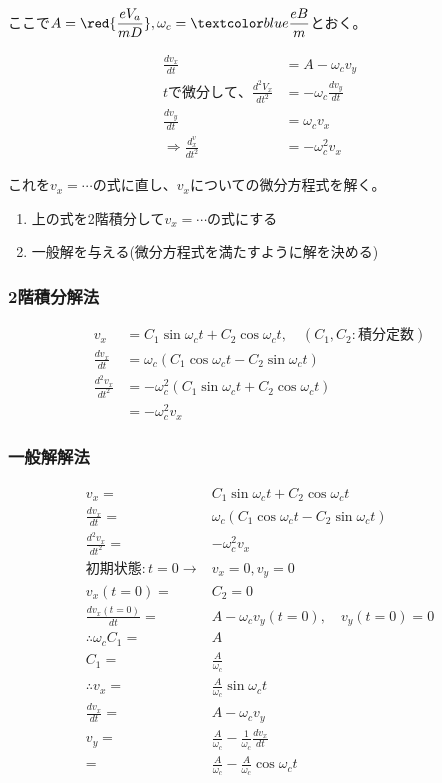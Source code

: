 \documentclass[12pt]{ltjsarticle}
\newcommand{\ds}{\displaystyle}
\begin{document}
ここで$\ds A=\red{\frac{eV_a}{mD}},\omega_c=\blue{\frac{eB}{m}}$とおく。

\begin{align*}
\frac{dv_x}{dt}&=A-\omega_cv_y\\
tで微分して、\frac{d^2V_x}{dt^2}&=-\omega_c\frac{dv_y}{dt}\\
\frac{dv_y}{dt}&=\omega_cv_x\\
\Rightarrow \frac{d^v_x}{dt^2}&=-\omega_c^2v_x
\end{align*}

これを$v_x=\cdots$の式に直し、$v_x$についての微分方程式を解く。
\begin{enumerate}
\item 上の式を2階積分して$v_x=\cdots$の式にする
\item 一般解を与える(微分方程式を満たすように解を決める)
\end{enumerate}

\subsubsection*{2階積分解法}
\begin{align*}
v_x&=C_1\sin{\omega_ct}+C_2\cos{\omega_ct},\quad (C_1,C_2:積分定数)\\
\frac{dv_x}{dt}&=\omega_c(C_1\cos{\omega_ct}-C_2\sin{\omega_ct})\\
\frac{d^2v_x}{dt^2}&=
-\omega_c^2(C_1\sin{\omega_ct}+C_2\cos{\omega_ct})\\
&=-\omega_c^2v_x
\end{align*}

\subsubsection*{一般解解法}
\begin{align*}
v_x=&C_1\sin{\omega_ct}+C_2\cos{\omega_ct}\\
\frac{dv_x}{dt}=&\omega_c(C_1\cos{\omega_ct}-C_2\sin{\omega_ct})\\
\frac{d^2v_x}{dt^2}=&-\omega_c^2v_x\\
初期状態:t=0\rightarrow &v_x=0,v_y=0\\
v_x(t=0)=&C_2=0\\
\frac{dv_x(t=0)}{dt}=&A-\omega_c v_y(t=0),\quad v_y(t=0)=0\\
\therefore \omega_cC_1=&A\\
C_1=&\frac{A}{\omega_c}\\
\therefore v_x=&\frac{A}{\omega_c}\sin{\omega_ct}\\
\frac{dv_x}{dt}=&A-\omega_c v_y\\
v_y=&\frac{A}{\omega_c}-\frac1{\omega_c}\frac{dv_x}{dt}\\
=&\frac{A}{\omega_c}-\frac{A}{\omega_c}\cos{\omega_ct}
\end{align*}
\end{document}
